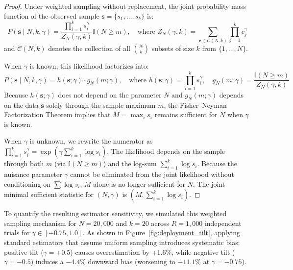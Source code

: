 \documentclass[10pt,a4paper]{article}
\begin{document}
\begin{proof}
Under weighted sampling without replacement, the joint probability mass function of the observed sample $\mathbf{s} = \{s_1, \dots, s_k\}$ is:
\begin{equation}
P(\mathbf{s} \mid N, k, \gamma) = \frac{\prod_{i=1}^k s_i^\gamma}{Z_N(\gamma, k)} \mathbb{I}(N \ge m), \quad \text{where } Z_N(\gamma, k) = \sum_{\mathbf{c} \in \mathcal{C}(N, k)} \prod_{j=1}^k c_j^\gamma
\end{equation}
and $\mathcal{C}(N, k)$ denotes the collection of all $\binom{N}{k}$ subsets of size $k$ from $\{1, \dots, N\}$. 

When $\gamma$ is known, this likelihood factorizes into:
\begin{equation}
P(\mathbf{s} \mid N, k, \gamma) = h(\mathbf{s}; \gamma) \cdot g_N(m; \gamma), \quad \text{where } h(\mathbf{s}; \gamma) = \prod_{i=1}^k s_i^\gamma, \quad g_N(m; \gamma) = \frac{\mathbb{I}(N \ge m)}{Z_N(\gamma, k)}
\end{equation}
Because $h(\mathbf{s}; \gamma)$ does not depend on the parameter $N$ and $g_N(m; \gamma)$ depends on the data $\mathbf{s}$ solely through the sample maximum $m$, the Fisher--Neyman Factorization Theorem implies that $M = \max_i s_i$ remains sufficient for $N$ when $\gamma$ is known.

When $\gamma$ is unknown, we rewrite the numerator as $\prod_{i=1}^k s_i^\gamma = \exp\left( \gamma \sum_{i=1}^k \log s_i \right)$. The likelihood depends on the sample through both $m$ (via $\mathbb{I}(N \ge m)$) and the log-sum $\sum_{i=1}^k \log s_i$. Because the nuisance parameter $\gamma$ cannot be eliminated from the joint likelihood without conditioning on $\sum \log s_i$, $M$ alone is no longer sufficient for $N$. The joint minimal sufficient statistic for $(N, \gamma)$ is $\left(M, \sum_{i=1}^k \log s_i\right)$.
\end{proof}

To quantify the resulting estimator sensitivity, we simulated this weighted sampling mechanism for $N = 20,000$ and $k = 20$ across $R = 1,000$ independent trials for $\gamma \in [-0.75, 1.0]$. As shown in Figure~\ref{fig:deployment_tilt}, applying standard estimators that assume uniform sampling introduces systematic bias: positive tilt ($\gamma = +0.5$) causes overestimation by $+1.6\%$, while negative tilt ($\gamma = -0.5$) induces a $-4.4\%$ downward bias (worsening to $-11.1\%$ at $\gamma = -0.75$). 
\end{document}
